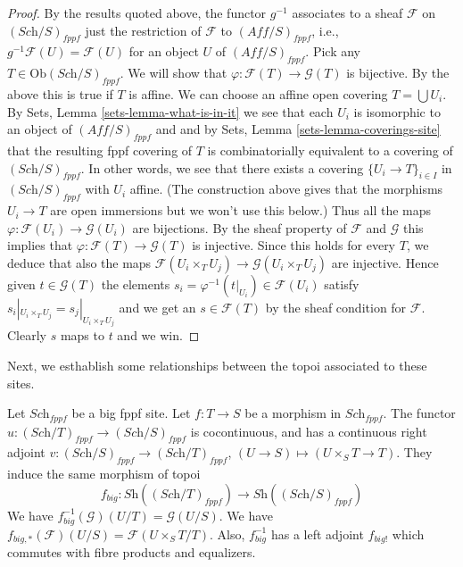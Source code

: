 \begin{proof}
\medskip\noindent
By the results quoted above,
the functor $g^{-1}$ associates to a sheaf $\mathcal{F}$ on
$(\textit{Sch}/S)_{fppf}$ just the restriction of $\mathcal{F}$
to $(\textit{Aff}/S)_{fppf}$, i.e., $g^{-1}\mathcal{F}(U) = \mathcal{F}(U)$
for an object $U$ of $(\textit{Aff}/S)_{fppf}$. Pick any
$T \in \text{Ob}(\textit{Sch}/S)_{fppf}$. We will show that
$\varphi : \mathcal{F}(T) \to \mathcal{G}(T)$ is bijective.
By the above this is true if $T$ is affine.
We can choose an affine open covering $T = \bigcup U_i$. By
Sets, Lemma \ref{sets-lemma-what-is-in-it} we see that
each $U_i$ is isomorphic to an object of $(\textit{Aff}/S)_{fppf}$
and and by Sets, Lemma \ref{sets-lemma-coverings-site}
that the resulting fppf covering of $T$ is combinatorially
equivalent to a covering of $(\textit{Sch}/S)_{fppf}$.
In other words, we see that there exists a covering
$\{U_i \to T\}_{i \in I}$ in $(\textit{Sch}/S)_{fppf}$ with $U_i$ affine.
(The construction above gives that the morphisms $U_i \to T$ are open
immersions but we won't use this below.)
Thus all the maps $\varphi : \mathcal{F}(U_i) \to \mathcal{G}(U_i)$
are bijections. By the sheaf property of $\mathcal{F}$ and $\mathcal{G}$
this implies that $\varphi : \mathcal{F}(T) \to \mathcal{G}(T)$ is injective.
Since this holds for every $T$, we deduce that also the maps
$\mathcal{F}(U_i \times_T U_j) \to \mathcal{G}(U_i \times_T U_j)$
are injective. Hence given $t \in \mathcal{G}(T)$
the elements $s_i = \varphi^{-1}(t|_{U_i}) \in \mathcal{F}(U_i)$
satisfy $s_i|_{U_i \times_T U_j} = s_j|_{U_i \times_T U_j}$
and we get an $s \in \mathcal{F}(T)$ by the sheaf condition
for $\mathcal{F}$. Clearly $s$ maps to $t$ and we win.
\end{proof}

\noindent
Next, we esthablish some relationships between the topoi
associated to these sites.

\begin{lemma}
\label{lemma-morphism-big-fppf}
Let $\textit{Sch}_{fppf}$ be a big fppf site.
Let $f : T \to S$ be a morphism in $\textit{Sch}_{fppf}$.
The functor $u : (\textit{Sch}/T)_{fppf} \to (\textit{Sch}/S)_{fppf}$
is cocontinuous, and has a continuous right adjoint
$v : (\textit{Sch}/S)_{fppf} \to (\textit{Sch}/T)_{fppf}$,
$(U \to S) \mapsto (U \times_S T \to T)$. They induce the same morphism
of topoi
$$
f_{big} :
\textit{Sh}((\textit{Sch}/T)_{fppf})
\longrightarrow
\textit{Sh}((\textit{Sch}/S)_{fppf})
$$
We have $f_{big}^{-1}(\mathcal{G})(U/T) = \mathcal{G}(U/S)$.
We have $f_{big, *}(\mathcal{F})(U/S) = \mathcal{F}(U\times_ST/T)$.
Also, $f_{big}^{-1}$ has a left adjoint $f_{big!}$ which commutes with
fibre products and equalizers.
\end{lemma}

